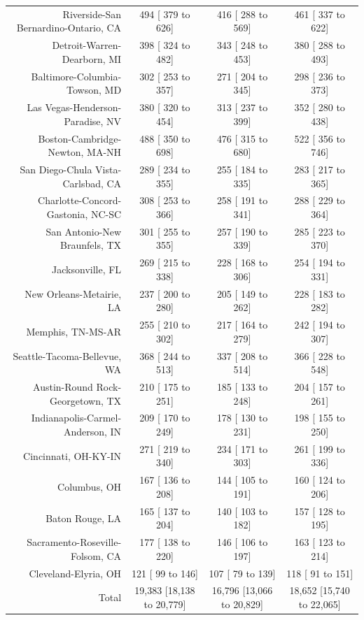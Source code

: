 \documentclass{article}
\begin{document}
\begin{table}[H]
\begin{tabular}{|r|c|c|c|}
		Riverside-San Bernardino-Ontario, CA &    494 [   379 to    626] &    416 [   288 to    569] &    461 [   337 to    622]\\
		Detroit-Warren-Dearborn, MI &    398 [   324 to    482] &    343 [   248 to    453] &    380 [   288 to    493]\\
		Baltimore-Columbia-Towson, MD &    302 [   253 to    357] &    271 [   204 to    345] &    298 [   236 to    373]\\
		Las Vegas-Henderson-Paradise, NV &    380 [   320 to    454] &    313 [   237 to    399] &    352 [   280 to    438]\\
		Boston-Cambridge-Newton, MA-NH &    488 [   350 to    698] &    476 [   315 to    680] &    522 [   356 to    746]\\
		San Diego-Chula Vista-Carlsbad, CA &    289 [   234 to    355] &    255 [   184 to    335] &    283 [   217 to    365]\\
		Charlotte-Concord-Gastonia, NC-SC &    308 [   253 to    366] &    258 [   191 to    341] &    288 [   229 to    364]\\
		San Antonio-New Braunfels, TX &    301 [   255 to    355] &    257 [   190 to    339] &    285 [   223 to    370]\\
		Jacksonville, FL &    269 [   215 to    338] &    228 [   168 to    306] &    254 [   194 to    331]\\
		New Orleans-Metairie, LA &    237 [   200 to    280] &    205 [   149 to    262] &    228 [   183 to    282]\\
		Memphis, TN-MS-AR &    255 [   210 to    302] &    217 [   164 to    279] &    242 [   194 to    307]\\
		Seattle-Tacoma-Bellevue, WA &    368 [   244 to    513] &    337 [   208 to    514] &    366 [   228 to    548]\\
		Austin-Round Rock-Georgetown, TX &    210 [   175 to    251] &    185 [   133 to    248] &    204 [   157 to    261]\\
		Indianapolis-Carmel-Anderson, IN &    209 [   170 to    249] &    178 [   130 to    231] &    198 [   155 to    250]\\
		Cincinnati, OH-KY-IN &    271 [   219 to    340] &    234 [   171 to    303] &    261 [   199 to    336]\\
		Columbus, OH &    167 [   136 to    208] &    144 [   105 to    191] &    160 [   124 to    206]\\
		Baton Rouge, LA &    165 [   137 to    204] &    140 [   103 to    182] &    157 [   128 to    195]\\
		Sacramento-Roseville-Folsom, CA &    177 [   138 to    220] &    146 [   106 to    197] &    163 [   123 to    214]\\
		Cleveland-Elyria, OH &    121 [    99 to    146] &    107 [    79 to    139] &    118 [    91 to    151]\\
		\hline
		Total & 19,383 [18,138 to 20,779] & 16,796 [13,066 to 20,829] & 18,652 [15,740 to 22,065]\\
		\hline
	\end{tabular}
\end{table}
\end{document}
